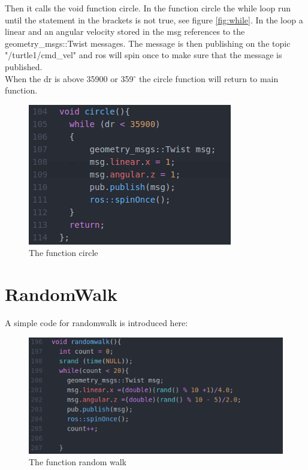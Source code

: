 Then it calls the void function circle. In the function circle the while loop run until the statement in the brackets is not true, see figure \ref{fig:while}. In the loop a linear and an angular velocity stored in the msg references to the geometry\_msgs::Twist messages. The message is then publishing on the topic "/turtle1/cmd\_vel" and ros will spin once to make sure that the message is published.\\  When the dr is above 35900 or 359${^\circ}$ the circle function will return to main function.\\

\begin{figure}[h]
\begin{center}
\includegraphics[width=.5\textwidth]{figures/void-circle.png}
\caption{The function circle}\label{fig:void-circle}
\end{center}
\end{figure}

\section{RandomWalk}

A simple code for randomwalk is introduced here:\\

\begin{figure}[h]
\begin{center}
\includegraphics[width=.5\textwidth]{figures/randomWalk.png}
\caption{The function random walk}\label{fig:randomWalk}
\end{center}
\end{figure}

